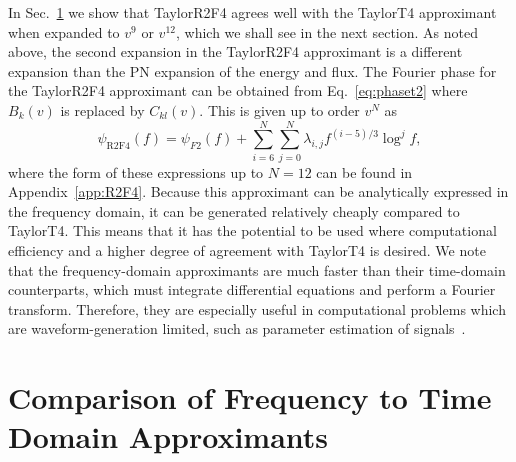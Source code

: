 In Sec.~\ref{sec:freq_vs_time_approx} we show that TaylorR2F4 agrees well with the TaylorT4 approximant
when expanded to $v^9$ or $v^{12}$, which we shall see in the next section.  As
noted above, the second expansion in the TaylorR2F4 approximant is a different
expansion than the \ac{PN} expansion of the energy and flux.  The Fourier phase
for the TaylorR2F4 approximant can be obtained from Eq.~\eqref{eq:phaset2}  where
$B_{k}(v)$ is replaced by $C_{kl}(v)$.  This is given up to order $v^N$ as
%
\begin{equation}
%
\psi_{\mathrm{R2F4}}(f) = \psi_{F2}(f) + \sum_{i=6}^{N} \sum_{j=0}^{N}
\lambda_{i, j} f^{(i-5)/3} \log^j f,
%
\end{equation}
%
where the form of these expressions up to $N=12$ can be found in
Appendix~\ref{app:R2F4}.
Because this approximant can be analytically expressed in the frequency domain,
it can be generated relatively cheaply compared to TaylorT4. This means that it has
the potential to be used where computational efficiency and 
a higher degree of agreement with TaylorT4 is desired.
We note that the frequency-domain approximants are much faster than their
time-domain counterparts, which must integrate differential equations and perform 
a Fourier transform. Therefore, they are especially useful in computational problems 
which are waveform-generation limited, 
such as parameter estimation of signals~\cite{Aasi:2013jjl}.

\section{Comparison of Frequency to Time Domain Approximants}
\label{sec:freq_vs_time_approx}

